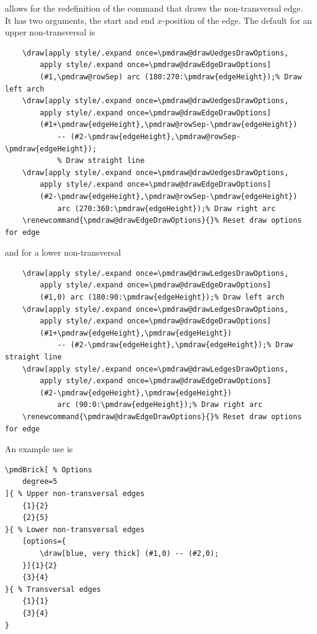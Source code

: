 \documentclass{ltxdoc}
\begin{document}
allows for the redefinition of the command that draws the non-transversal edge. It has two arguments, the start and end \( x \)-position of the edge. The default for an upper non-transversal is
\begin{verbatim}
    \draw[apply style/.expand once=\pmdraw@drawUedgesDrawOptions,
        apply style/.expand once=\pmdraw@drawEdgeDrawOptions] 
        (#1,\pmdraw@rowSep) arc (180:270:\pmdraw{edgeHeight});% Draw left arch
    \draw[apply style/.expand once=\pmdraw@drawUedgesDrawOptions,
        apply style/.expand once=\pmdraw@drawEdgeDrawOptions] 
        (#1+\pmdraw{edgeHeight},\pmdraw@rowSep-\pmdraw{edgeHeight}) 
            -- (#2-\pmdraw{edgeHeight},\pmdraw@rowSep-\pmdraw{edgeHeight});
            % Draw straight line
    \draw[apply style/.expand once=\pmdraw@drawUedgesDrawOptions,
        apply style/.expand once=\pmdraw@drawEdgeDrawOptions] 
        (#2-\pmdraw{edgeHeight},\pmdraw@rowSep-\pmdraw{edgeHeight}) 
            arc (270:360:\pmdraw{edgeHeight});% Draw right arc
    \renewcommand{\pmdraw@drawEdgeDrawOptions}{}% Reset draw options for edge
\end{verbatim}
and for a lower non-transversal
\begin{verbatim}
    \draw[apply style/.expand once=\pmdraw@drawLedgesDrawOptions,
        apply style/.expand once=\pmdraw@drawEdgeDrawOptions] 
        (#1,0) arc (180:90:\pmdraw{edgeHeight});% Draw left arch
    \draw[apply style/.expand once=\pmdraw@drawLedgesDrawOptions,
        apply style/.expand once=\pmdraw@drawEdgeDrawOptions] 
        (#1+\pmdraw{edgeHeight},\pmdraw{edgeHeight}) 
            -- (#2-\pmdraw{edgeHeight},\pmdraw{edgeHeight});% Draw straight line
    \draw[apply style/.expand once=\pmdraw@drawLedgesDrawOptions,
        apply style/.expand once=\pmdraw@drawEdgeDrawOptions] 
        (#2-\pmdraw{edgeHeight},\pmdraw{edgeHeight}) 
            arc (90:0:\pmdraw{edgeHeight});% Draw right arc
    \renewcommand{\pmdraw@drawEdgeDrawOptions}{}% Reset draw options for edge
\end{verbatim}
An example use is
\begin{center}
    \begin{minipage}{\dimexpr0.85\textwidth-2\fboxrule-2\fboxsep\relax}
        \begin{minipage}[c]{0.4\linewidth}
\begin{verbatim}
\pmdBrick[ % Options
    degree=5
]{ % Upper non-transversal edges
    {1}{2}
    {2}{5}
}{ % Lower non-transversal edges
    [options={
        \draw[blue, very thick] (#1,0) -- (#2,0);
    }]{1}{2}
    {3}{4}
}{ % Transversal edges
    {1}{1}
    {3}{4}
}
\end{verbatim}
        \end{minipage}
        \hfill
        \begin{minipage}[c]{0.4\linewidth}
        \end{minipage}
    \end{minipage}%
\end{center}
\end{document}
